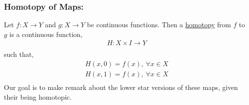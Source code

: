     \subsubsection{Homotopy of Maps:}
        \begin{definition} Let $f: X\rightarrow Y$ and $g: X\rightarrow Y$ be continuous functions.
        Then a \underline{homotopy} from $f$ to $g$ is a continuous function,
        \begin{align*}
            H: X\times I\rightarrow Y\\
        \end{align*}
        such that,
        \begin{align*}
            H(x,0)=f(x),\ \forall x\in X\\
            H(x,1)=f(x),\ \forall x\in X\\
        \end{align*}
        Our goal is to make remark about the lower star versions of these maps, given their being homotopic.
        \end{definition}
